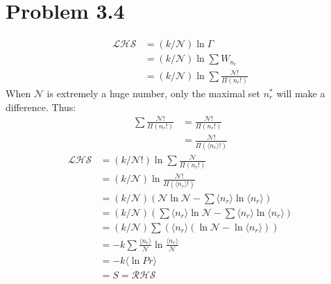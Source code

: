\documentclass{article}
\begin{document}
\section*{Problem 3.4}
    \begin{align}
    \mathcal{LHS}&=(k/\mathcal{N}) \ln\Gamma\\
    &=(k/\mathcal{N}) \ln\sum W_{n_r}\\
    &=(k/\mathcal{N}) \ln\sum \frac{\mathcal{N}!}{\Pi (n_r!)}
    \end{align}
When $\mathcal{N}$ is extremely a huge number, only the maximal set ${n_r^*}$ will make a difference. Thus:
    \begin{align}
    \sum \frac{\mathcal{N}!}{\Pi (n_r!)}&=\frac{\mathcal{N}!}{\Pi (n_r!)}\\
    &=\frac{\mathcal{N}!}{\Pi (\langle n_r \rangle !)}
    \end{align}
    \begin{align}
    \mathcal{LHS}&=(k/\mathcal{N}!) \ln\sum \frac{\mathcal{N}}{\Pi (n_r!)}\\
    &=(k/\mathcal{N}) \ln\frac{\mathcal{N}!}{\Pi (\langle n_r \rangle !)}\\
    &=(k/\mathcal{N}) \left( \mathcal{N}\ln\mathcal{N} - \sum \langle n_r \rangle \ln \langle n_r \rangle \right)\\
    &=(k/\mathcal{N}) \left( \sum \langle n_r \rangle \ln\mathcal{N} - \sum \langle n_r \rangle \ln \langle n_r \rangle \right)\\
    &=(k/\mathcal{N}) \sum \left( \langle n_r \rangle \left(\ln\mathcal{N} -\ln \langle n_r \rangle \right) \right)\\
    &=-k\sum \frac{\langle n_r \rangle}{\mathcal{N}} \ln \frac{\langle n_r \rangle}{\mathcal{N}}\\
    &=-k\langle \ln Pr \rangle\\
    &=S=\mathcal{RHS}
    \end{align}
\end{document}
